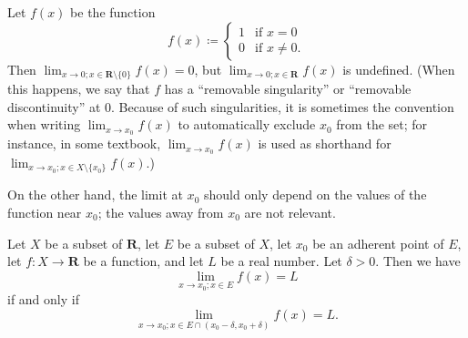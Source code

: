 \begin{example}\label{9.3.17}
    Let \(f(x)\) be the function
    \[
        f(x) \coloneqq \begin{cases}
            1 & \text{if } x = 0     \\
            0 & \text{if } x \neq 0.
        \end{cases}
    \]
    Then \(\lim_{x \to 0 ; x \in \mathbf{R} \setminus \{0\}} f(x) = 0\), but \(\lim_{x \to 0 ; x \in \mathbf{R}} f(x)\) is undefined.
    (When this happens, we say that \(f\) has a ``removable singularity'' or ``removable discontinuity'' at \(0\).
    Because of such singularities, it is sometimes the convention when writing \(\lim_{x \to x_0} f(x)\) to automatically exclude \(x_0\) from the set;
    for instance, in some textbook, \(\lim_{x \to x_0} f(x)\) is used as shorthand for \(\lim_{x \to x_0 ; x \in X \setminus \{x_0\}} f(x)\).)
\end{example}

\begin{note}
    On the other hand, the limit at \(x_0\) should only depend on the values of the function near \(x_0\);
    the values away from \(x_0\) are not relevant.
\end{note}

\begin{proposition}\label{9.3.18}
    Let \(X\) be a subset of \(\mathbf{R}\), let \(E\) be a subset of \(X\), let \(x_0\) be an adherent point of \(E\), let \(f : X \to \mathbf{R}\) be a function, and let \(L\) be a real number.
    Let \(\delta > 0\).
    Then we have
    \[
        \lim_{x \to x_0 ; x \in E} f(x) = L
    \]
    if and only if
    \[
        \lim_{x \to x_0 ; x \in E \cap (x_0 - \delta, x_0 + \delta)} f(x) = L.
    \]
\end{proposition}

